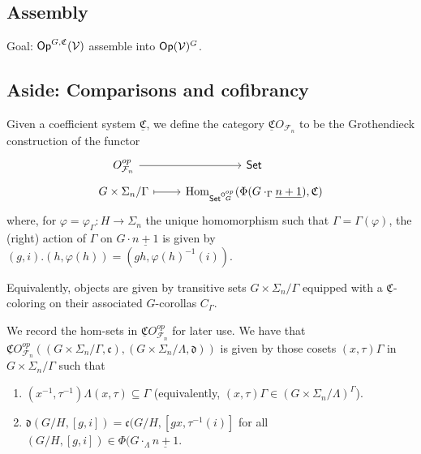 \documentclass[a4paper,10pt
,draft
]{article}%
\renewcommand{\phi}{\varphi}
\newcommand{\UC}{\underline{\mathfrak C}}
\renewcommand{\F}{\mathcal F}
\renewcommand{\1}{\ensuremath{\mathbb{id}}}
\begin{document}
\subsection{Assembly}

Goal: $\mathsf{Op}^{G,\mathfrak C}(\mathcal V)$ assemble into $\mathsf{Op}(\mathcal V)^G$.







\newpage

\subsection{Aside: Comparisons and cofibrancy}



\begin{definition}
      Given a coefficient system $\UC$, we define the category $\UC O_{\F_n}$ to be the Grothendieck construction of the functor
      \begin{equation}
            \begin{tikzcd}[row sep = tiny]
                  O_{\F_n}^{op} \arrow[r]
                  &
                  \Set
                  \\
                  G \times \Sigma_n / \Gamma \arrow[r, mapsto]
                  &
                  \Hom_{\Set^{\mathsf O_G^{op}}}(\Phi(G \cdot_\Gamma \underline{n+1}), \mathfrak C)
            \end{tikzcd}
      \end{equation}
      where, for $\phi = \phi_\Gamma: H \to \Sigma_n$ the unique homomorphism such that $\Gamma = \Gamma(\phi)$,
      the (right) action of $\Gamma$ on $G \cdot \underline{n+1}$ is given by
      $(g,i).(h,\phi(h)) = (gh, \phi(h)^{-1}(i))$.
\end{definition}

Equivalently, objects are given by transitive sets $G \times \Sigma_n / \Gamma$
equipped with a $\UC$-coloring on their associated $G$-corollas $C_\Gamma$.

\begin{remark}
      We record the hom-sets in $\UC O_{\F_n}^{op}$ for later use. We have that
      \mbox{$\UC O_{\F_n}^{op}((G \times \Sigma_n/\Gamma, \mathfrak c), (G \times \Sigma_n / \Lambda, \mathfrak d))$}
      is given by those cosets $(x,\tau)\Gamma$ in $G \times \Sigma_n / \Gamma$ such that
      \begin{enumerate}
      \item $(x^{-1},\tau^{-1})\Lambda(x,\tau) \subseteq \Gamma$
            (equivalently, $(x,\tau)\Gamma \in (G \times \Sigma_n/\Lambda)^\Gamma$).
      \item $\mathfrak d(G/H, [g,i]) = \mathfrak c(G/H, [g x, \tau^{-1}(i)]$
            for all $(G/H, [g,i]) \in \Phi(G \cdot_{\Lambda} \underline{n+1}$.
      \end{enumerate}
\end{remark}
\end{document}
